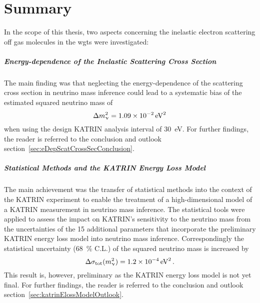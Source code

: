 \chapter{Summary}
\label{sec:conclusion}
In the scope of this thesis, two aspects concerning the inelastic electron scattering off gas molecules in the \gls{wgts} were investigated:

\paragraph{Energy-dependence of the Inelastic Scattering Cross Section}
The main finding was that neglecting the energy-dependence of the scattering cross section in neutrino mass inference could lead to a systematic bias of the estimated squared neutrino mass of
\begin{equation*}
\Delta m_\upnu^2 = \SI{1.09e-2}{eV^2}
\end{equation*}
when using the design KATRIN analysis interval of \SI{30}{eV}. For further findings, the reader is referred to the conclusion and outlook section~\ref{sec:eDepScatCrossSecConclusion}.


\paragraph{Statistical Methods and the KATRIN Energy Loss Model}
The main achievement was the transfer of statistical methods into the context of the KATRIN experiment to enable the treatment of a high-dimensional model of a KATRIN measurement in neutrino mass inference. The statistical tools were applied to assess the impact on KATRIN's sensitivity to the neutrino mass from the uncertainties of the 15 additional parameters that incorporate the preliminary KATRIN energy loss model into neutrino mass inference. Correspondingly the statistical uncertainty (\SI{68}{\percent} C.L.) of the squared neutrino mass is increased by
\begin{equation*}
\Delta \sigma_\mathrm{tot}(m_\upnu^2) = \SI{1.2e-4}{eV^2}
\text{\,.} 
\end{equation*} 
This result is, however, preliminary as the KATRIN energy loss model is not yet final. For further findings, the reader is referred to the conclusion and outlook section~\ref{sec:katrinElossModelOutlook}.

